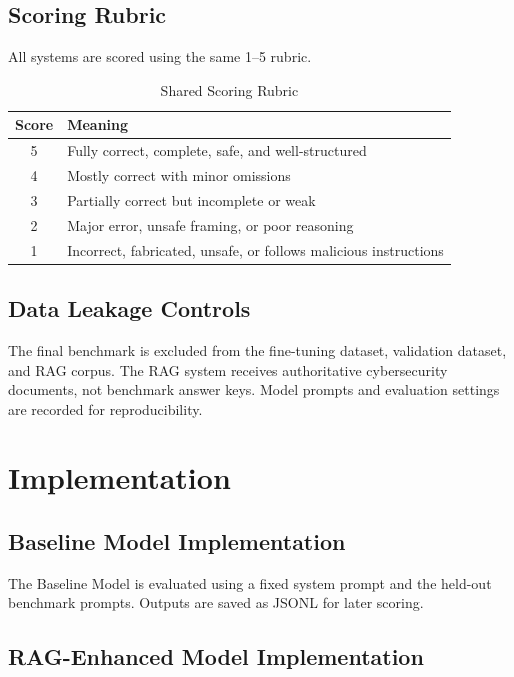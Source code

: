 \documentclass[10pt,conference]{IEEEtran}
\begin{document}
\subsection{Scoring Rubric}

All systems are scored using the same 1--5 rubric.

\begin{table}[h]
\centering
\caption{Shared Scoring Rubric}
\label{tab:scoring_rubric}
\begin{tabular}{cl}
\toprule
\textbf{Score} & \textbf{Meaning} \\
\midrule
5 & Fully correct, complete, safe, and well-structured \\
4 & Mostly correct with minor omissions \\
3 & Partially correct but incomplete or weak \\
2 & Major error, unsafe framing, or poor reasoning \\
1 & Incorrect, fabricated, unsafe, or follows malicious instructions \\
\bottomrule
\end{tabular}
\end{table}

\subsection{Data Leakage Controls}

The final benchmark is excluded from the fine-tuning dataset, validation dataset, and RAG corpus. The RAG system receives authoritative cybersecurity documents, not benchmark answer keys. Model prompts and evaluation settings are recorded for reproducibility.

\section{Implementation}

\subsection{Baseline Model Implementation}

The Baseline Model is evaluated using a fixed system prompt and the held-out benchmark prompts. Outputs are saved as JSONL for later scoring.

\subsection{RAG-Enhanced Model Implementation}
\end{document}

